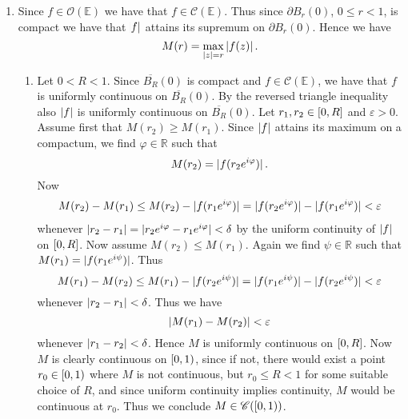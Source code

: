 \begin{enumerate}[label = \textbf{Exercise \arabic*.},wide = 0pt, itemsep=1.5ex]
	\item
		Since $f \in \mathcal{O}(\mathbb{E})$ we have that $f \in \mathscr{C}(\mathbb{E})$. Thus since $\partial B_r(0)$, $0 \leq r < 1$, is compact we have that $\abs{f}$ attains its supremum on $\partial B_r(0)$. Hence we have 
				\begin{equation}
					M(r) = \max_{\abs[0]{z} = r} \abs[0]{f(z)}.
				\end{equation}
		\begin{enumerate}[label = (\roman*),wide = 0pt, itemsep=1.5ex]
			\item Let $0 < R < 1$. Since $\overline{B_R}(0)$ is compact and $f \in \mathscr{C}(\mathbb{E})$, we have that $f$ is uniformly continuous on $\overline{B_R}(0)$. By the reversed triangle inequality also $\abs[0]{f}$ is uniformly continuous on $\overline{B_R}(0)$. Let $r_1,r_2 \in \intcc{0,R}$ and $\varepsilon > 0$. Assume first that $M(r_2) \geq M(r_1)$. Since $\abs[0]{f}$ attains its maximum on a compactum, we find $\varphi \in \mathbb{R}$ such that
				\begin{equation}
					M(r_2) = \abs[0]{f(r_2 e^{i\varphi})}.
				\end{equation}
				Now
				\begin{align*}
					M(r_2) - M(r_1) \leq M(r_2) - \abs[0]{f(r_1e^{i\varphi})} = \abs[0]{f(r_2e^{i\varphi})} - \abs[0]{f(r_1e^{i\varphi})} < \varepsilon
				\end{align*}
				\noindent whenever $\abs[0]{r_2 - r_1} = \abs[0]{r_2e^{i\varphi} - r_1e^{i\varphi}} < \delta$ by the uniform continuity of $\abs[0]{f}$ on $\intcc{0,R}$. Now assume $M(r_2) \leq M(r_1)$. Again we find $\psi \in \mathbb{R}$ such that $M(r_1) = \abs[0]{f(r_1e^{i\psi})}$. Thus
				\begin{equation}
					M(r_1) - M(r_2) \leq M(r_1) - \abs[0]{f(r_2e^{i\psi})} = \abs[0]{f(r_1e^{i\psi})} - \abs[0]{f(r_2e^{i\psi})} < \varepsilon
				\end{equation}
				\noindent whenever $\abs[0]{r_2 - r_1} < \delta$. Thus we have
				\begin{equation}
					\abs[0]{M(r_1) - M(r_2)} < \varepsilon
				\end{equation}
				\noindent whenever $\abs[0]{r_1 - r_2} < \delta$. Hence $M$ is uniformly continuous on $\intcc{0,R}$. Now $M$ is clearly continuous on $\intco{0,1}$, since if not, there would exist a point $r_0 \in \intco{0,1}$ where $M$ is not continuous, but $r_0 \leq R < 1$ for some suitable choice of $R$, and since uniform continuity implies continuity, $M$ would be continuous at $r_0$. Thus we conclude $M \in \mathscr{C}(\intco{0,1})$.\\

\end{enumerate}
\end{enumerate}
